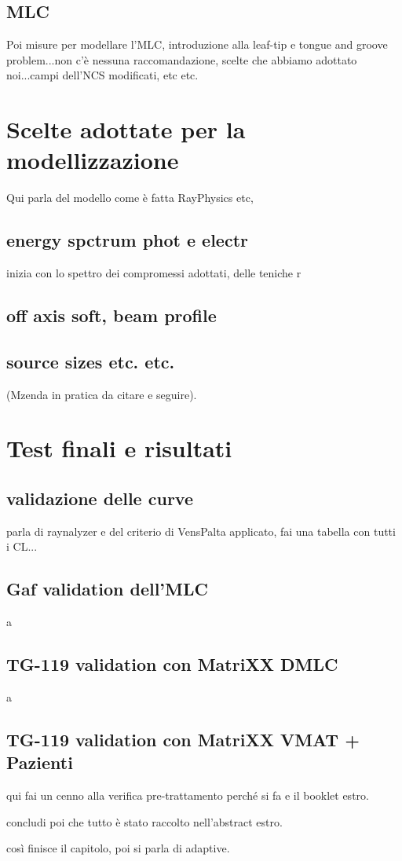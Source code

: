 \subsection{MLC}
Poi misure per modellare l'MLC, introduzione alla leaf-tip e tongue and groove problem...non c'è nessuna raccomandazione, scelte che abbiamo adottato noi...campi dell'NCS modificati, etc etc.



\section{Scelte adottate per la modellizzazione}
Qui parla del modello come è fatta RayPhysics etc,
\subsection{energy spctrum phot e electr}
inizia con lo spettro dei compromessi adottati, delle teniche r
\subsection{off axis soft, beam profile}
\subsection{source sizes etc. etc.}
(Mzenda in pratica da citare e seguire).


\section{Test finali e risultati}
\subsection{validazione delle curve}
parla di raynalyzer e del criterio di VensPalta applicato, fai una tabella con tutti i CL...
\subsection{Gaf validation dell'MLC}
a
\subsection{TG-119 validation con MatriXX DMLC}
a
\subsection{TG-119 validation con MatriXX VMAT + Pazienti}
qui fai un cenno alla verifica pre-trattamento perché si fa e il booklet estro.

concludi poi che tutto è stato raccolto nell'abstract estro.

così finisce il capitolo, poi si parla di adaptive.















